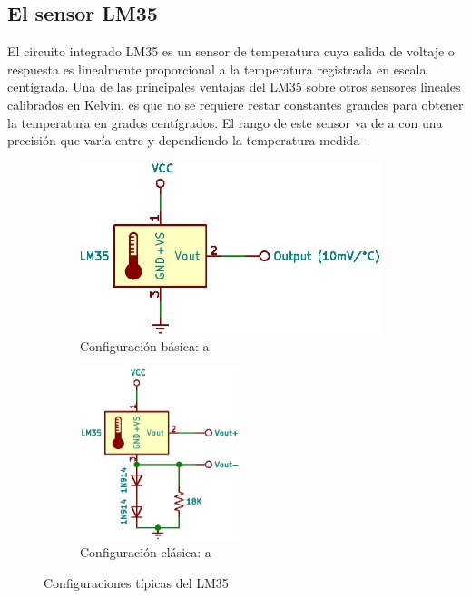 %
%


\subsection{El sensor LM35}%
\label{sec:intro-lm35}
El circuito integrado LM35 es un sensor de temperatura cuya salida de voltaje o respuesta es linealmente proporcional a la temperatura registrada en escala centígrada.
Una de las principales ventajas del LM35 sobre otros sensores lineales calibrados en Kelvin, es que no se requiere restar constantes grandes para obtener la temperatura en grados centígrados.
El rango de este sensor va de  a  con una precisión que varía entre  y  dependiendo la temperatura medida~.

\begin{figure}
	\centering
	\begin{subfigure}[b]{0.5\columnwidth}
		\centering
		\includegraphics[width=\textwidth,height=5cm,keepaspectratio]{img/lm35a.jpg}
		\caption{Configuración básica:  a }
		\label{fig:lm35config-a} %
	\end{subfigure}%
	\begin{subfigure}[b]{0.5\columnwidth}
		\centering
		\includegraphics[width=\textwidth,height=5cm,keepaspectratio]{img/lm35b.jpg}
		\caption{Configuración clásica:  a }
		\label{fig:lm35config-b} %
	\end{subfigure}
	\caption{Configuraciones típicas del LM35}
	\label{fig:lm35config} %
\end{figure}

